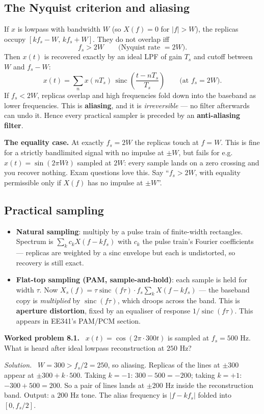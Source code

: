 \documentclass[11pt,a4paper]{article}
\newcommand{\sinc}{\operatorname{sinc}}
\newenvironment{worked}[1]{\par\vspace{4pt}\noindent\textbf{\color{warmred}Worked problem #1.}\ \ignorespaces}{\par\vspace{4pt}}
\newcommand{\soln}{\par\vspace{2pt}\noindent\textit{Solution.}\ \ignorespaces}
\begin{document}
\subsection{The Nyquist criterion and aliasing}
If $x$ is lowpass with bandwidth $W$ (so $X(f)=0$ for $|f|>W$), the replicas occupy
$[kf_s-W,\,kf_s+W]$. They do not overlap iff
\[
f_s>2W \qquad\text{(Nyquist rate $=2W$)}.
\]
Then $x(t)$ is recovered exactly by an ideal LPF of gain $T_s$ and cutoff between $W$ and $f_s-W$:
\[
x(t)=\sum_{n}x(nT_s)\,\sinc\!\left(\frac{t-nT_s}{T_s}\right)\qquad\text{(at $f_s=2W$).}
\]
If $f_s<2W$, replicas overlap and high frequencies fold down into the baseband as lower frequencies. This is
\textbf{aliasing}, and it is \emph{irreversible} --- no filter afterwards can undo it. Hence every practical
sampler is preceded by an \textbf{anti-aliasing filter}.

\begin{trapbox}
\textbf{The equality case.} At exactly $f_s=2W$ the replicas touch at $f=W$. This is fine for a strictly
bandlimited signal with no impulse at $\pm W$, but fails for e.g.\ $x(t)=\sin(2\pi Wt)$ sampled at $2W$: every
sample lands on a zero crossing and you recover nothing. Exam questions love this. Say ``$f_s>2W$, with
equality permissible only if $X(f)$ has no impulse at $\pm W$''.
\end{trapbox}

\subsection{Practical sampling}
\begin{itemize}[leftmargin=*]
\item \textbf{Natural sampling}: multiply by a pulse train of finite-width rectangles. Spectrum is
$\sum_k c_k X(f-kf_s)$ with $c_k$ the pulse train's Fourier coefficients --- replicas are weighted by a sinc
envelope but each is undistorted, so recovery is still exact.
\item \textbf{Flat-top sampling (PAM, sample-and-hold)}: each sample is held for width $\tau$. Now
$X_s(f)=\tau\sinc(f\tau)\cdot f_s\sum_kX(f-kf_s)$ --- the baseband copy is \emph{multiplied} by
$\sinc(f\tau)$, which droops across the band. This is \textbf{aperture distortion}, fixed by an equaliser of
response $1/\sinc(f\tau)$. This appears in EE341's PAM/PCM section.
\end{itemize}

\begin{worked}{8.1}
$x(t)=\cos(2\pi\cdot 300t)$ is sampled at $f_s=500$ Hz. What is heard after ideal lowpass reconstruction at
$250$ Hz?
\end{worked}
\soln
$W=300>f_s/2=250$, so aliasing. Replicas of the lines at $\pm300$ appear at $\pm300+k\cdot500$. Taking
$k=-1$: $300-500=-200$; taking $k=+1$: $-300+500=200$. So a pair of lines lands at $\pm200$ Hz inside the
reconstruction band. Output: a $200$ Hz tone. The alias frequency is $|f-kf_s|$ folded into $[0,f_s/2]$.
\end{document}
